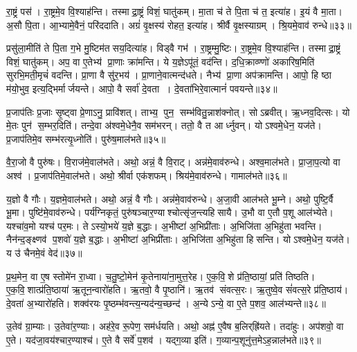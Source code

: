 रा॒ष्ट्रं पस॑।
रा॒ष्ट्रमे॒व वि॒श्याह॑न्ति।
तस्माद्रा॒ष्ट्रं विशं॒ घातु॑कम्।
मा॒ता च॑ ते पि॒ता च॑ त॒ इत्या॑ह।
इ॒यं वै मा॒ता।
अ॒सौ पि॒ता।
आ॒भ्यामे॒वैनं॒ परि॑ददाति।
अग्रं॑ वृ॒क्षस्य॑ रोहत॒ इत्या॑ह।
श्रीर्वै वृ॒क्षस्याग्रम्।
श्रि॒यमे॒वाव॑ रुन्धे॥३३॥

प्रसु॑ला॒मीति॑ ते पि॒ता ग॒भे मु॒ष्टिम॑तसय॒दित्या॑ह।
विड्वै गभ॑।
रा॒ष्ट्रम्मु॒ष्टिः।
रा॒ष्ट्रमे॒व वि॒श्याह॑न्ति।
तस्माद्रा॒ष्ट्रं विशं॒ घातु॑कम्।
अप॒ वा ए॒तेभ्य॑ प्रा॒णाः क्रा॑मन्ति।
ये य॒ज्ञेऽपू॑तं॒ वद॑न्ति।
द॒धि॒क्राव्ण्णो॑ अकारिष॒मिति॑ सुरभि॒मती॒मृचं॑ वदन्ति।
प्रा॒णा वै सु॑र॒भय॑।
प्रा॒णाने॒वात्मन्द॑धते।
नैभ्य॑ प्रा॒णा अप॑क्रामन्ति।
आपो॒ हि ष्ठा म॑यो॒भुव॒ इत्य॒द्भिर्मार्जयन्ते।
आपो॒ वै सर्वा॑ दे॒वता।
दे॒वता॑भिरे॒वात्मानं॑ पवयन्ते॥३४॥\anuvakamend[रा॒ष्ट्रस्य॒ मध्यं॒ पुष्य॑ति॒ गभो॑ रुन्धे दधते च॒त्वारि॑ च]

प्र॒जाप॑तिः प्र॒जाः सृ॒ष्ट्वा प्रे॒णाऽनु॒ प्रावि॑शत्।
ताभ्य॒ पुन॒ सम्भ॑वितु॒न्नाश॑क्नोत्।
सोऽब्रवीत्।
ऋ॒ध्नव॒दित्सः।
यो मे॒तः पुन॑ स॒म्भर॒दिति॑।
तन्दे॒वा अ॑श्वमे॒धेनै॒व सम॑भरन्।
ततो॒ वै त आर्ध्नुवन्।
योऽश्वमे॒धेन॒ यज॑ते।
प्र॒जाप॑तिमे॒व सम्भ॑रत्यृ॒ध्नोति॑।
पुरु॑ष॒माल॑भते॥३५॥

वै॒रा॒जो वै पुरु॑षः।
वि॒राज॑मे॒वाल॑भते।
अथो॒ अन्नं॒ वै वि॒राट्।
अन्न॑मे॒वाव॑रुन्धे।
अश्व॒माल॑भते।
प्रा॒जा॒प॒त्यो वा अश्व॑।
प्र॒जाप॑तिमे॒वाल॑भते।
अथो॒ श्रीर्वा एक॑शफम्।
श्रिय॑मे॒वाव॑रुन्धे।
गामाल॑भते॥३६॥

य॒ज्ञो वै गौः।
य॒ज्ञमे॒वाल॑भते।
अथो॒ अन्नं॒ वै गौः।
अन्न॑मे॒वाव॑रुन्धे।
अ॒जा॒वी आल॑भते भू॒म्ने।
अथो॒ पुष्टि॒र्वै भू॒मा।
पुष्टि॑मे॒वाव॑रुन्धे।
पर्य॑ग्निकृतं॒ पुरु॑षञ्चार॒ण्याश्चोत्सृ॑ज॒न्त्यहिसायै।
उ॒भौ वा ए॒तौ प॒शू आल॑भ्येते।
यश्चा॑व॒मो यश्च॑ पर॒मः।
तेऽस्यो॒भये॑ य॒ज्ञे ब॒द्धाः।
अ॒भीष्टा॑ अ॒भिप्री॑ताः।
अ॒भिजि॑ता अ॒भिहु॑ता भवन्ति।
नैन॑न्द॒ङ्क्ष्णव॑ प॒शवो॑ य॒ज्ञे ब॒द्धाः।
अ॒भीष्टा॑ अ॒भिप्री॑ताः।
अ॒भिजि॑ता अ॒भिहु॑ता हिसन्ति।
योऽश्वमे॒धेन॒ यज॑ते।
य उ॑ चैनमे॒वं वेद॑॥३७॥\anuvakamend[ल॒भ॒ते॒ गामाल॑भते पर॒मोऽष्टौ च॑]

प्र॒थ॒मेन॒ वा ए॒ष स्तोमे॑न रा॒ध्वा।
च॒तु॒ष्टो॒मेन॑ कृ॒तेनाया॑ना॒मुत्त॒रेह\sn{}।
ए॒क॒वि॒शे प्र॑ति॒ष्ठायां॒ प्रति॑ तिष्ठति।
ए॒क॒वि॒शात्प्र॑ति॒ष्ठाया॑ ऋ॒तून॒न्वारो॑हति।
ऋ॒तवो॒ वै पृ॒ष्ठानि॑।
ऋ॒तव॑ संवत्स॒रः।
ऋ॒तुष्वे॒व सं॑वत्स॒रे प्र॑ति॒ष्ठाय॑।
दे॒वता॑ अ॒भ्यारो॑हति।
शक्व॑रयः पृ॒ष्ठम्भ॑वन्त्य॒न्यद॑न्य॒च्छन्द॑।
अ॒न्येऽन्ये॒ वा ए॒ते प॒शव॒ आल॑भ्यन्ते॥३८॥

उ॒तेव॑ ग्रा॒म्याः।
उ॒तेवा॑र॒ण्याः।
अह॑रे॒व रू॒पेण॒ सम॑र्धयति।
अथो॒ अह्न॑ ए॒वैष ब॒लिर्‌ह्रि॑यते।
तदा॑हुः।
अप॑शवो॒ वा ए॒ते।
यद॑जा॒वय॑श्चार॒ण्याश्च॑।
ए॒ते वै सर्वे॑ प॒शव॑।
यद्ग॒व्या इति॑।
ग॒व्यान्प॒शूनु॑त्त॒मेऽह॒न्नाल॑भते॥३९॥

